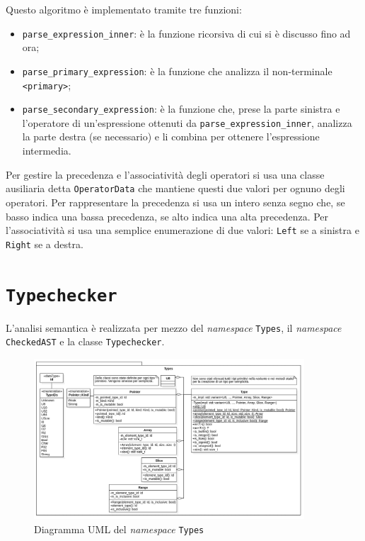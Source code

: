 Questo algoritmo \`e implementato tramite tre funzioni:
\begin{itemize}
	\item \texttt{parse\_expression\_inner}: \`e la funzione ricorsiva di cui si \`e discusso fino ad ora;
	\item \texttt{parse\_primary\_expression}: \`e la funzione che analizza il non-terminale \texttt{<primary>};
	\item \texttt{parse\_secondary\_expression}: \`e la funzione che, prese la parte sinistra e l'operatore di un'espressione ottenuti da \linebreak \texttt{parse\_expression\_inner}, analizza la parte destra (se necessario) e li combina per ottenere l'espressione intermedia.
\end{itemize}
Per gestire la precedenza e l'associativit\`a degli operatori si usa una classe ausiliaria detta \texttt{OperatorData} che mantiene questi due valori per ognuno degli operatori. Per rappresentare la precedenza si usa un intero senza segno che, se basso indica una bassa precedenza, se alto indica una alta precedenza. Per l'associativit\`a si usa una semplice enumerazione di due valori: \texttt{Left} se a sinistra e \texttt{Right} se a destra.

\section{\texttt{Typechecker}}
\label{sec:typechecker}

L'analisi semantica \`e realizzata per mezzo del \textit{namespace} \texttt{Types}, il \textit{namespace} \texttt{CheckedAST} e la classe \texttt{Typechecker}.

\begin{figure}[H]
	\centering
	\includegraphics[width=0.9\textwidth]{figures/types.png}
	\caption{Diagramma UML del \textit{namespace} \texttt{Types}}
	\label{fig:typechecker-types}
\end{figure}

